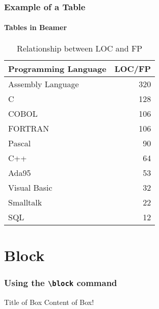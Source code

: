 \documentclass[english]{beamer}
\begin{document}
\begin{frame}
 \frametitle{Example of a Table}
 \framesubtitle{Tables in Beamer}
\begin{table}[ht]
 \begin{tabular}{|l|r|} \hline
 \textbf{Programming Language}     & \textbf{LOC/FP}  \\
 \hline \hline
 Assembly Language		&     320      \\ 
 C					&     128      \\
 COBOL				&     106      \\
 FORTRAN			&     106      \\
 Pascal				&       90      \\
 C++					&       64      \\  
 Ada95				&       53      \\
 Visual Basic			&       32      \\
 Smalltalk				&       22      \\
 SQL					&       12      \\\hline
 \end{tabular}
 \caption{Relationship between LOC and FP}
\end{table}
\end{frame}



\section{Block}

\begin{frame}
 \frametitle{Using the \texttt{\textbackslash block} command}
\begin{block}{Title of Box}
Content of Box!
\end{block}
\end{frame}
\end{document}
